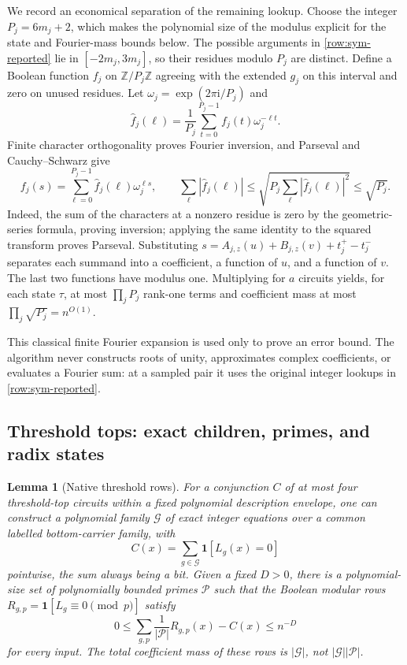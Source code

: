 \documentclass[11pt,letterpaper]{article}
\newtheorem{lemma}[theorem]{Lemma}
\theoremstyle{definition}
\theoremstyle{remark}
\newcommand{\ind}{\mathbf 1}
\begin{document}
We record an economical separation of the remaining lookup.
Choose the integer $P_j=6m_j+2$, which makes the polynomial size of
the modulus explicit for the state and Fourier-mass bounds below.
The possible arguments in
\eqref{row:sym-reported} lie in $[-2m_j,3m_j]$, so their residues modulo
$P_j$ are distinct.  Define a Boolean function $f_j$ on
$\mathbb Z/P_j\mathbb Z$ agreeing with the extended $g_j$ on this
interval and zero on unused residues.  Let
$\omega_j=\exp(2\pi\mathrm{i}/P_j)$ and
\[
 \widehat f_j(\ell)=\frac1{P_j}\sum_{t=0}^{P_j-1}
                         f_j(t)\omega_j^{-\ell t}.
\]
Finite character orthogonality proves Fourier inversion, and Parseval
and Cauchy--Schwarz give
\begin{equation}
 f_j(s)=\sum_{\ell=0}^{P_j-1}\widehat f_j(\ell)\omega_j^{\ell s},
 \qquad
 \sum_\ell|\widehat f_j(\ell)|
 \le\sqrt{P_j\sum_\ell|\widehat f_j(\ell)|^2}
 \le\sqrt{P_j}.
 \label{row:fourier}
\end{equation}
Indeed, the sum of the characters at a nonzero residue is zero by the
geometric-series formula, proving inversion; applying the same identity
to the squared transform proves Parseval.  Substituting
$s=A_{j,z}(u)+B_{j,z}(v)+t_j^+-t_j^-$ separates each summand into a
coefficient, a function of $u$, and a function of $v$.  The last two
functions have modulus one.  Multiplying for $a$ circuits yields, for
each state $\tau$, at most $\prod_jP_j$ rank-one terms and coefficient
mass at most $\prod_j\sqrt{P_j}=n^{O(1)}$.

This classical finite Fourier expansion is used only to prove an error
bound.  The algorithm never constructs roots of unity, approximates
complex coefficients, or evaluates a Fourier sum: at a sampled pair it
uses the original integer lookups in \eqref{row:sym-reported}.

\subsection{Threshold tops: exact children, primes, and radix states}

\begin{lemma}[Native threshold rows]
\label{row:threshold-rows}
For a conjunction $C$ of at most four threshold-top circuits within a
fixed polynomial description envelope, one can construct a polynomial
family $\mathcal G$ of exact integer equations over a common labelled
bottom-carrier family, with
\[
 C(x)=\sum_{g\in\mathcal G}\ind[L_g(x)=0]
\]
pointwise, the sum always being a bit.  Given a fixed $D>0$, there is a
polynomial-size set of polynomially bounded primes $\mathcal P$ such that
the Boolean modular rows $R_{g,p}=\ind[L_g\equiv0\pmod p]$ satisfy
\begin{equation}
 0\le\sum_{g,p}\frac1{|\mathcal P|}R_{g,p}(x)-C(x)\le n^{-D}
 \label{row:prime-error}
\end{equation}
for every input.  The total coefficient mass of these rows is
$|\mathcal G|$, not $|\mathcal G||\mathcal P|$.
\end{lemma}
\end{document}
